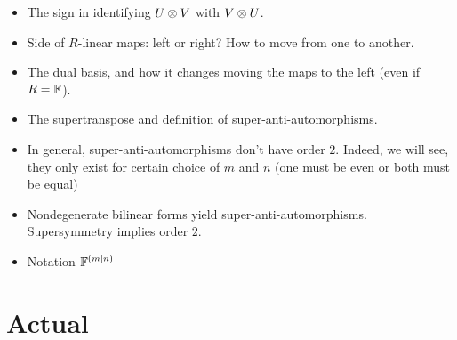 \documentclass{amsbook}
\newcommand{\cmark}{\ding{51}}%
\newcommand{\done}{\rlap{$\square$}{\raisebox{2pt}{\large\hspace{1pt}\cmark}}%
\hspace{-2.5pt}}
\begin{document}
\begin{itemize}
        \item[\done] The sign in identifying $U \otimes V$ with $V \otimes U$.
    
        \item Side of $R$-linear maps: left or right? How to move from one to another.
    
        \item The dual basis, and how it changes moving the maps to the left (even if $R=\mathbb{F}$).
    
        \item The supertranspose and definition of super-anti-automorphisms.
        
        \item In general, super-anti-automorphisms don't have order $2$. Indeed, we will see, they only exist for certain choice of $m$ and $n$ (one must be even or both must be equal)
        
        \item Nondegenerate bilinear forms yield super-anti-automorphisms. Supersymmetry implies order $2$.
        
        \item Notation $\mathbb{F}^{(m|n)}$

\end{itemize}


\section{Actual}
\end{document}
